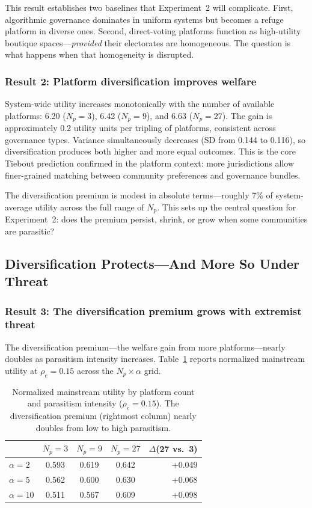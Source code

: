 \documentclass{article}
\begin{document}
This result establishes two baselines that Experiment~2 will complicate. First, algorithmic governance dominates in uniform systems but becomes a refuge platform in diverse ones. Second, direct-voting platforms function as high-utility boutique spaces---\textit{provided} their electorates are homogeneous. The question is what happens when that homogeneity is disrupted.

\subsubsection{Result 2: Platform diversification improves welfare}

System-wide utility increases monotonically with the number of available platforms: 6.20 ($N_p = 3$), 6.42 ($N_p = 9$), and 6.63 ($N_p = 27$). The gain is approximately 0.2 utility units per tripling of platforms, consistent across governance types. Variance simultaneously decreases (SD from 0.144 to 0.116), so diversification produces both higher and more equal outcomes. This is the core Tiebout prediction confirmed in the platform context: more jurisdictions allow finer-grained matching between community preferences and governance bundles.

The diversification premium is modest in absolute terms---roughly 7\% of system-average utility across the full range of $N_p$. This sets up the central question for Experiment~2: does the premium persist, shrink, or grow when some communities are parasitic?

\subsection{Diversification Protects---And More So Under Threat}
\label{sec:results_diversification}

\subsubsection{Result 3: The diversification premium grows with extremist threat}

The diversification premium---the welfare gain from more platforms---nearly doubles as parasitism intensity increases. Table~\ref{tab:divpremium} reports normalized mainstream utility at $\rho_e = 0.15$ across the $N_p \times \alpha$ grid.

\begin{table}[t]
\centering
\small
\begin{tabular}{lcccr}
\hline
 & $N_p = 3$ & $N_p = 9$ & $N_p = 27$ & $\Delta$(27 vs.\ 3) \\
\hline
$\alpha = 2$  & 0.593 & 0.619 & 0.642 & +0.049 \\
$\alpha = 5$  & 0.562 & 0.600 & 0.630 & +0.068 \\
$\alpha = 10$ & 0.511 & 0.567 & 0.609 & +0.098 \\
\hline
\end{tabular}
\caption{Normalized mainstream utility by platform count and parasitism intensity ($\rho_e = 0.15$). The diversification premium (rightmost column) nearly doubles from low to high parasitism.}
\label{tab:divpremium}
\end{table}
\end{document}
